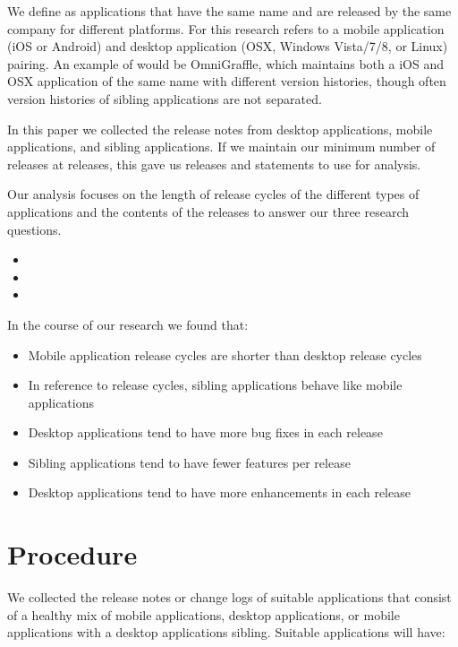 \documentclass{acm_proc_article-sp}
\begin{document}
We define \textbf{\sibs} as applications that have the same name and are released by the same company for different platforms. 
For this research \sibs refers to a mobile application (iOS or Android) and desktop application (OSX, Windows Vista/7/8, or Linux) pairing.
An example of \sibs would be OmniGraffle, which maintains both a iOS and OSX application of the same name with different version histories, though often version histories of sibling applications are not separated.


In this paper we collected the release notes from \NumDesktopApps desktop applications, \NumMobileApps mobile applications, and \NumSiblingpApps sibling applications. 
If we maintain our minimum number of releases at \MinNumReleases releases, this gave us \TotalNumReleases releases and \TotalNumStatements statements to use for analysis.

Our analysis focuses on the length of release cycles of the different types of applications and the contents of the releases to answer our three research questions.

\begin{itemize}
\item \RQOne
\item \RQTwo
\item \RQThree
\end{itemize}

In the course of our research we found that:
\begin{itemize}
\item Mobile application release cycles are shorter than desktop release cycles
\item In reference to release cycles, sibling applications behave like mobile applications
\item Desktop applications tend to have more bug fixes in each release
\item Sibling applications tend to have fewer features per release
\item Desktop applications tend to have more enhancements in each release
\end{itemize}


\section{Procedure}
We collected the release notes or change logs of suitable applications that consist of a healthy mix of mobile applications, desktop applications, or  mobile applications with a desktop applications sibling. 
Suitable applications will have:
\end{document}
